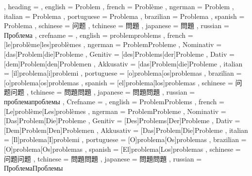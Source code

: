   {
    , heading =   {
                    , english     = Problem
                    , french      = Problème
                    , ngerman     = Problem
                    , italian     = Problema
                    , portuguese  = Problema
                    , brazilian   = Problema
                    , spanish     = Problema
                    , schinese    = 问题
                    , tchinese    = 問題
                    , japanese    = 問題
                    , russian     = Проблема
                  }
    , crefname =  {
                    , english     = {problem}{problems}
                    , french      = [le]{problème}[les]{problèmes}
                    , ngerman     = { {Problem}{Probleme}
                                      , Nominativ = [das]{Problem}[die]{Probleme}
                                      , Genitiv   = [des]{Problems}[der]{Probleme}
                                      , Dativ     = [dem]{Problem}[den]{Problemen}
                                      , Akkusativ = [das]{Problem}[die]{Probleme}
                                    }
                    , italian     = [il]{problema}[i]{problemi}
                    , portuguese  = [o]{problema}[os]{problemas}
                    , brazilian   = [o]{problema}[os]{problemas}
                    , spanish     = [el]{problema}[los]{problemas}
                    , schinese    = {问题}{问题}
                    , tchinese    = {問題}{問題}
                    , japanese    = {問題}{問題}
                    , russian     = {проблема}{проблемы}
                  }
    , Crefname =  {
                    , english     = {Problem}{Problems}
                    , french      = [Le]{problème}[Les]{problèmes}
                    , ngerman     = { {Problem}{Probleme}
                                      , Nominativ = [Das]{Problem}[Die]{Probleme}
                                      , Genitiv   = [Des]{Problems}[Der]{Probleme}
                                      , Dativ     = [Dem]{Problem}[Den]{Problemen}
                                      , Akkusativ = [Das]{Problem}[Die]{Probleme}
                                    }
                    , italian     = [Il]{problema}[I]{problemi}
                    , portuguese  = [O]{problema}[Os]{problemas}
                    , brazilian   = [O]{problema}[Os]{problemas}
                    , spanish     = [El]{problema}[Los]{problemas}
                    , schinese    = {问题}{问题}
                    , tchinese    = {問題}{問題}
                    , japanese    = {問題}{問題}
                    , russian     = {Проблема}{Проблемы}
                  }
  }

